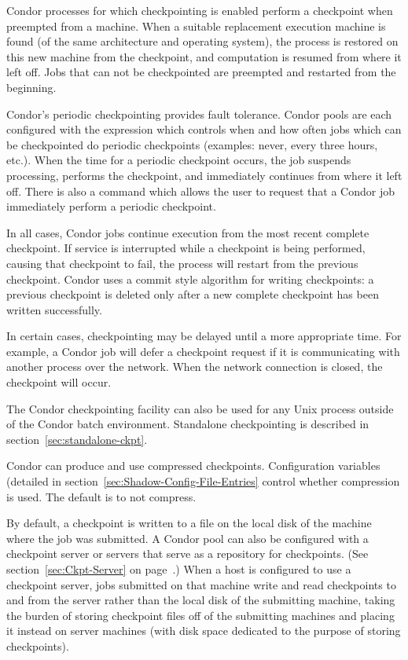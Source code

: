 Condor processes for which checkpointing is enabled perform a
checkpoint when preempted from a machine.  When a suitable replacement
execution machine is found (of the same architecture and operating
system), the process is restored on this new machine from the
checkpoint, and computation is resumed from where it left off.  Jobs
that can not be checkpointed are preempted and restarted from the
beginning.

Condor's periodic checkpointing provides fault tolerance.  Condor
pools are each configured with the 
expression which controls when and how often jobs which can be
checkpointed do periodic checkpoints (examples: never, every three
hours, etc.).  When the time for a periodic checkpoint occurs, the job
suspends processing, performs the checkpoint, and immediately
continues from where it left off.  There is also a  command
which allows the user to request that a Condor job immediately perform
a periodic checkpoint.

In all cases, Condor jobs continue execution from the most recent
complete checkpoint.  If service is interrupted while a checkpoint is
being performed, causing that checkpoint to fail, the process will
restart from the previous checkpoint.  Condor uses a commit style
algorithm for writing checkpoints: a previous checkpoint is deleted
only after a new complete checkpoint has been written successfully.

In certain cases, checkpointing may be delayed until a more appropriate
time.  For example, a Condor job will defer a checkpoint request if
it is communicating with another process over the network.  When the
network connection is closed, the checkpoint will occur.

The Condor checkpointing facility can also be used for any Unix process
outside of the Condor batch environment. Standalone checkpointing
is described in section~\ref{sec:standalone-ckpt}.

Condor can produce and use compressed checkpoints.
Configuration variables (detailed in 
section~\ref{sec:Shadow-Config-File-Entries}
control whether compression is used.
The default is to not compress.

By default, a checkpoint is written to a file on the local disk of the
machine where the job was submitted.  A Condor pool can also be
configured with a checkpoint server or servers that
serve as a repository for checkpoints.  (See
section~\ref{sec:Ckpt-Server} on page~\pageref{sec:Ckpt-Server}.)
When a host is configured to use a checkpoint server, jobs submitted
on that machine write and read checkpoints to and from the server
rather than the local disk of the submitting machine, taking the
burden of storing checkpoint files off of the submitting machines and
placing it instead on server machines (with disk space dedicated to
the purpose of storing checkpoints).

